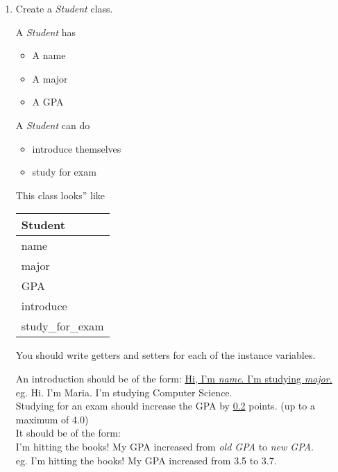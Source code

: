 \documentclass{article}
\newcommand{\tab}{\hspace*{0.25in}}
\newcommand{\csq}[1]{\reflectbox{''}#1''}  %
\begin{document}
\begin{enumerate}
	\item Create a \textit{Student} class.\\
	\begin{minipage}{.6\textwidth}		
		A \textit{Student} has
		\begin{itemize}
			\item A name
			\item A major
			\item A GPA	
		\end{itemize}
	
		A \textit{Student} can do
		\begin{itemize}
			\item introduce themselves
			\item study for exam
		\end{itemize}
	\end{minipage} 
	\begin{minipage}{.4\textwidth}
		This class \csq{looks} like
		 
		\vspace*{1em}
		\begin{tabular}{|l|}
			\hline Student\\ \hline
			name\\ major\\ GPA\\ \hline
			introduce\\ study\_for\_exam \\  \hline
		\end{tabular}
	\end{minipage}

	\vspace*{2ex}
	You should write getters and setters for each of the instance variables.\

	An introduction should be of the form: \underline{Hi, I'm  \textit{name}.  
	I'm studying \textit{major}.}\\
	\tab \tab eg. Hi. I'm Maria. I'm studying Computer Science.\\

	Studying for an exam should increase the GPA by \underline{0.2} points. (up to a maximum of 4.0)\\  
	It should be of the form: \\
	I'm hitting the books! My GPA increased from \textit{old GPA} to \textit{new GPA}.\\
	\tab \tab eg. I'm hitting the books! My GPA increased from 3.5 to 3.7.\\




\end{enumerate}
\end{document}
